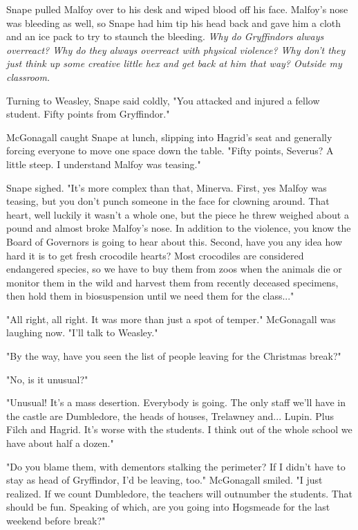 Snape pulled Malfoy over to his desk and wiped blood off his face. Malfoy's nose was bleeding as well, so Snape had him tip his head back and gave him a cloth and an ice pack to try to staunch the bleeding. \emph{Why do Gryffindors always overreact? Why do they always overreact with physical violence? Why don't they just think up some creative little hex and get back at him that way? Outside my classroom.}

Turning to Weasley, Snape said coldly, "You attacked and injured a fellow student. Fifty points from Gryffindor."

McGonagall caught Snape at lunch, slipping into Hagrid's seat and generally forcing everyone to move one space down the table. "Fifty points, Severus? A little steep. I understand Malfoy was teasing."

Snape sighed. "It's more complex than that, Minerva. First, yes Malfoy was teasing, but you don't punch someone in the face for clowning around. That heart, well luckily it wasn't a whole one, but the piece he threw weighed about a pound and almost broke Malfoy's nose. In addition to the violence, you know the Board of Governors is going to hear about this. Second, have you any idea how hard it is to get fresh crocodile hearts? Most crocodiles are considered endangered species, so we have to buy them from zoos when the animals die or monitor them in the wild and harvest them from recently deceased specimens, then hold them in biosuspension until we need them for the class..."

"All right, all right. It was more than just a spot of temper." McGonagall was laughing now. "I'll talk to Weasley."

"By the way, have you seen the list of people leaving for the Christmas break?"

"No, is it unusual?"

"Unusual! It's a mass desertion. Everybody is going. The only staff we'll have in the castle are Dumbledore, the heads of houses, Trelawney and... Lupin. Plus Filch and Hagrid. It's worse with the students. I think out of the whole school we have about half a dozen."

"Do you blame them, with dementors stalking the perimeter? If I didn't have to stay as head of Gryffindor, I'd be leaving, too." McGonagall smiled. "I just realized. If we count Dumbledore, the teachers will outnumber the students. That should be fun. Speaking of which, are you going into Hogsmeade for the last weekend before break?"

